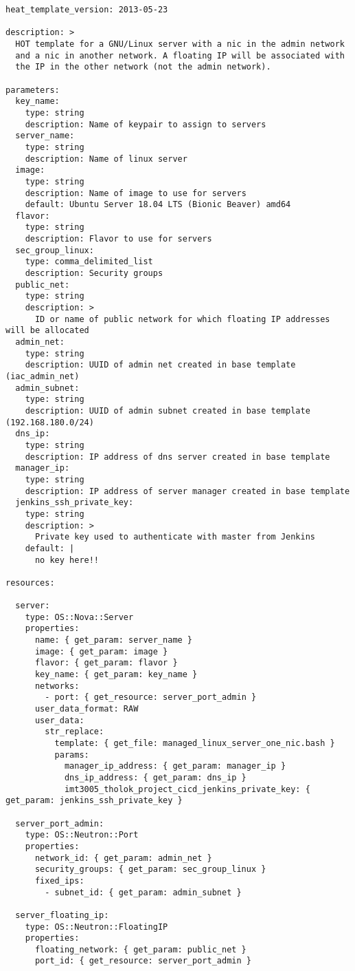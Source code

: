 \begin{verbatim}
heat_template_version: 2013-05-23

description: >
  HOT template for a GNU/Linux server with a nic in the admin network
  and a nic in another network. A floating IP will be associated with
  the IP in the other network (not the admin network).

parameters:
  key_name:
    type: string
    description: Name of keypair to assign to servers
  server_name:
    type: string
    description: Name of linux server
  image:
    type: string
    description: Name of image to use for servers
    default: Ubuntu Server 18.04 LTS (Bionic Beaver) amd64
  flavor:
    type: string
    description: Flavor to use for servers
  sec_group_linux:
    type: comma_delimited_list
    description: Security groups
  public_net:
    type: string
    description: >
      ID or name of public network for which floating IP addresses will be allocated
  admin_net:
    type: string
    description: UUID of admin net created in base template (iac_admin_net)
  admin_subnet:
    type: string
    description: UUID of admin subnet created in base template (192.168.180.0/24)
  dns_ip:
    type: string
    description: IP address of dns server created in base template
  manager_ip:
    type: string
    description: IP address of server manager created in base template
  jenkins_ssh_private_key:
    type: string
    description: >
      Private key used to authenticate with master from Jenkins
    default: |
      no key here!!

resources:

  server:
    type: OS::Nova::Server
    properties:
      name: { get_param: server_name }
      image: { get_param: image }
      flavor: { get_param: flavor }
      key_name: { get_param: key_name }
      networks:
        - port: { get_resource: server_port_admin }
      user_data_format: RAW
      user_data:
        str_replace:
          template: { get_file: managed_linux_server_one_nic.bash }
          params:
            manager_ip_address: { get_param: manager_ip }
            dns_ip_address: { get_param: dns_ip }
            imt3005_tholok_project_cicd_jenkins_private_key: { get_param: jenkins_ssh_private_key }

  server_port_admin:
    type: OS::Neutron::Port
    properties:
      network_id: { get_param: admin_net }
      security_groups: { get_param: sec_group_linux }
      fixed_ips:
        - subnet_id: { get_param: admin_subnet }

  server_floating_ip:
    type: OS::Neutron::FloatingIP
    properties:
      floating_network: { get_param: public_net }
      port_id: { get_resource: server_port_admin }
\end{verbatim}

